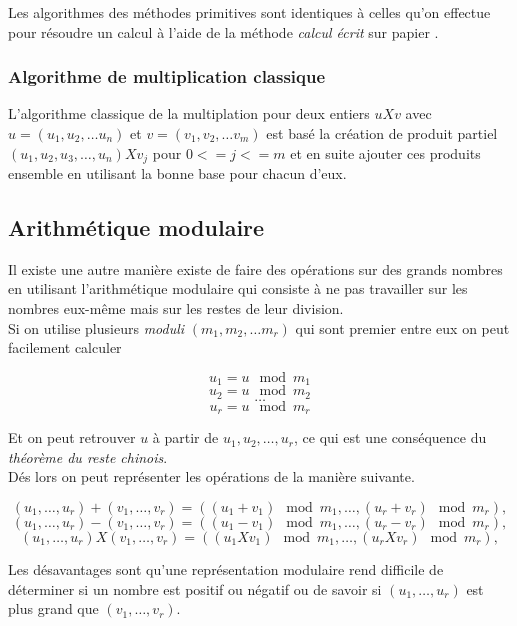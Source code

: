 \documentclass[letterpaper]{article}
\begin{document}
Les algorithmes des méthodes primitives sont identiques à celles qu'on effectue
pour résoudre un calcul à l'aide de la méthode \emph{calcul écrit} sur papier
\cite{knuth1997aocp}.

\subsubsection{Algorithme de multiplication classique}

L'algorithme classique de la multiplation pour deux entiers $u X v$ avec
$u = (u_1, u_2, \dots u_n)$ et $v = (v_1, v_2, \dots v_m)$ est basé la
création de produit partiel $(u_1, u_2, u_3, \dots, u_n) X v_j$ pour
$0 <= j <= m$  et en suite ajouter ces produits ensemble en utilisant la
bonne base pour chacun d'eux.


\subsection{Arithmétique modulaire}

Il existe une autre manière existe de faire des opérations sur des grands nombres
en utilisant l'arithmétique modulaire qui consiste à ne pas travailler sur les
nombres eux-même mais sur les restes de leur division\cite{wikiamodulaire}.\\

Si on utilise plusieurs \emph{moduli} $(m_1, m_2, \dots m_r)$ qui sont premier
entre eux on peut facilement calculer

  $$u_1 = u \mod m_1$$
  $$u_2 = u \mod m_2$$
  $$\dots$$
  $$u_r = u \mod m_r$$

Et on peut retrouver $u$ à partir de $u_1, u_2, \dots, u_r$, ce qui
est une conséquence du \emph{théorème du reste chinois}.\\

Dés lors on peut représenter les opérations de la manière suivante.

  $$(u_1, \dots, u_r) + (v_1, \dots, v_r) = ((u_1 + v_1) \mod m_1, \dots, (u_r + v_r) \mod m_r),$$
  $$(u_1, \dots, u_r) - (v_1, \dots, v_r) = ((u_1 - v_1) \mod m_1, \dots, (u_r - v_r) \mod m_r),$$
  $$(u_1, \dots, u_r) X (v_1, \dots, v_r) = ((u_1 X v_1) \mod m_1, \dots, (u_r X v_r) \mod m_r),$$

Les désavantages sont qu'une représentation modulaire rend difficile de
déterminer si un nombre est positif ou négatif ou de savoir si $(u_1, \dots, u_r)$
est plus grand que $(v_1, \dots, v_r)$.
\end{document}
